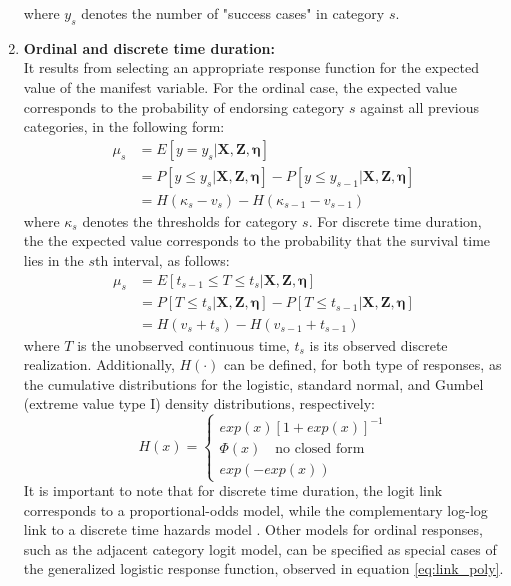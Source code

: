 \begin{enumerate}
	where $y_{s}$ denotes the number of "success cases" in category $s$.

	
	
	\item \textbf{Ordinal and discrete time duration:} \\
	It results from selecting an appropriate response function for the expected value of the manifest variable. For the ordinal case, the expected value corresponds to the probability of endorsing category $s$ against all previous categories, in the following form:
	\begin{equation} \label{eq:link_ord1}
		\begin{split}
			\mu_{s} &= E[y = y_{s} | \mathbf{X}, \mathbf{Z}, \pmb{\eta}] \\
			&= P[y \leq y_{s} | \mathbf{X}, \mathbf{Z}, \pmb{\eta}] - P[y \leq y_{s-1} | \mathbf{X}, \mathbf{Z}, \pmb{\eta}] \\
			&= H(\kappa_{s} - v_{s}) - H(\kappa_{s-1} - v_{s-1})
		\end{split}
	\end{equation}
	where $\kappa_{s}$ denotes the thresholds for category $s$. For discrete time duration, the the expected value corresponds to the probability that the survival time lies in the $s$th interval, as follows:
	\begin{equation} \label{eq:link_ord2}
		\begin{split}
			\mu_{s} &= E[t_{s-1} \leq T \le t_{s} | \mathbf{X}, \mathbf{Z}, \pmb{\eta}] \\
			&= P[T \leq t_{s} | \mathbf{X}, \mathbf{Z}, \pmb{\eta}] - P[T \leq t_{s-1} | \mathbf{X}, \mathbf{Z}, \pmb{\eta}] \\
			&= H(v_{s} + t_{s}) - H(v_{s-1} + t_{s-1})
		\end{split}
	\end{equation}
	where $T$ is the unobserved continuous time, $t_{s}$ is its observed discrete realization. Additionally, $H(\cdot)$ can be defined, for both type of responses, as the cumulative distributions for the logistic, standard normal, and Gumbel (extreme value type I) density  distributions, respectively:
	\begin{equation} \label{eq:response_ord}
	H(x) = 
	\begin{cases}
		exp(x)[1 + exp(x)]^{-1} \\
		\Phi(x) \quad \text{no closed form} \\
		exp(-exp(x))
	\end{cases}
	\end{equation}
	It is important to note that for discrete time duration, the logit link corresponds to a proportional-odds model, while the complementary log-log link to a discrete time hazards model \citep{Rabe_et_al_2001}. Other models for ordinal responses, such as the adjacent category logit model, can be specified as special cases of the generalized logistic response function, observed in equation \ref{eq:link_poly}. 
	

\end{enumerate}
